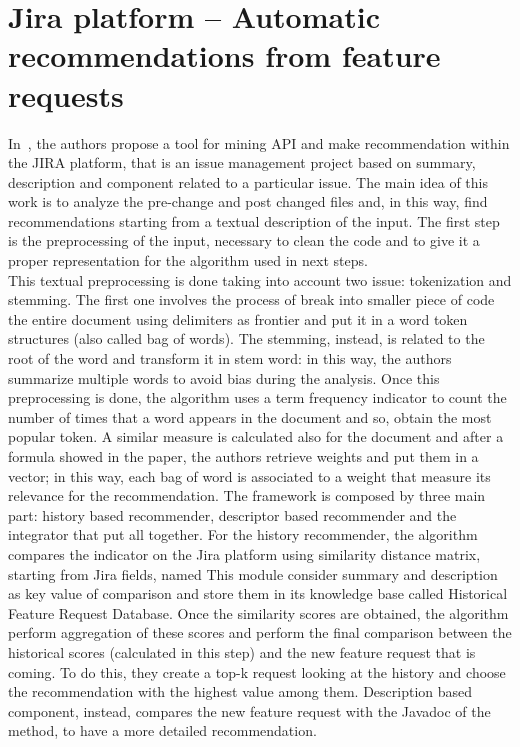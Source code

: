 \section{Jira platform -- Automatic recommendations from feature requests}
In~\cite{thung_automatic_2013}, the authors propose a tool for mining API and make recommendation within the JIRA platform, that is an issue management project based on summary, description and component related to a particular issue. The main idea of this work is to analyze the pre-change and post changed files and, in this way, find recommendations starting from a textual description of the input. The first step is the preprocessing of the input, necessary to clean the code and to give it a proper representation for the algorithm used in next steps. \\
This textual preprocessing is done taking into account two issue: tokenization and stemming. The first one involves the process of break into smaller piece of code the entire document using delimiters as frontier and put it in a word token structures (also called bag of words). The stemming, instead, is related to the root of the word and transform it in stem word: in this way, the authors summarize multiple words to avoid bias during the analysis. Once this preprocessing is done, the algorithm uses a term frequency indicator to count the number of times that a word appears in the document and so, obtain the most popular token. A similar measure is calculated also for the document and after a formula showed in the paper, the authors retrieve weights and put them in a vector; in this way, each bag of word is associated to a weight that measure its relevance for the recommendation. \newline
The framework is composed by three main part: history based recommender, descriptor based recommender and the integrator that put all together. For the history recommender, the algorithm compares the indicator on the Jira platform using similarity distance matrix, starting from Jira fields, named This module consider summary and description as key value of comparison and store them in its knowledge base called Historical Feature Request Database. Once the similarity scores are obtained, the algorithm perform aggregation of these scores and perform the final comparison between the historical scores (calculated in this step) and the new feature request that is coming. To do this, they create a top-k request looking at the history and choose the recommendation with the highest value among them. Description based component, instead, compares the new feature request with the Javadoc of the method, to have a more detailed recommendation. \\
